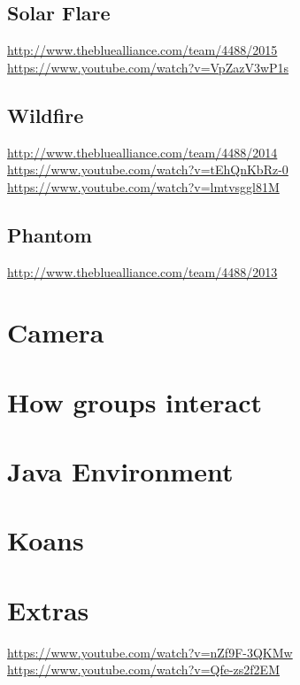 \documentclass[12pt]{article}
\begin{document}
\subsection{Solar Flare}
\url{http://www.thebluealliance.com/team/4488/2015}
\url{https://www.youtube.com/watch?v=VpZazV3wP1s}
\subsection{Wildfire}
\url{http://www.thebluealliance.com/team/4488/2014}
\url{https://www.youtube.com/watch?v=tEhQnKbRz-0}
\url{https://www.youtube.com/watch?v=lmtvsggl81M}
\subsection{Phantom}
\url{http://www.thebluealliance.com/team/4488/2013}



\section{Camera}

\section{How groups interact}

\section{Java Environment}

\section{Koans}

\section{Extras}
\url{https://www.youtube.com/watch?v=nZf9F-3QKMw}
\url{https://www.youtube.com/watch?v=Qfe-zs2f2EM}
\end{document}
